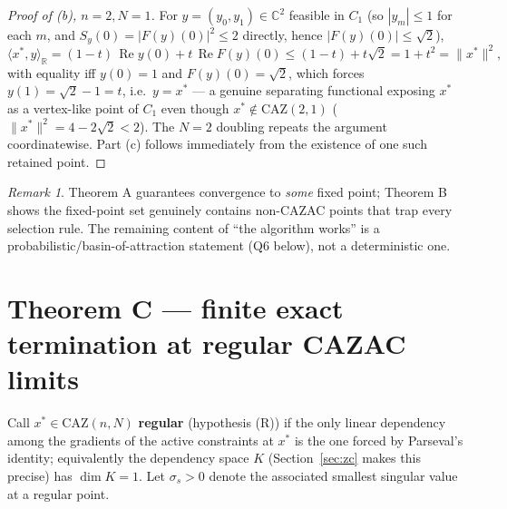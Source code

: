 \documentclass[11pt]{article}
\theoremstyle{plain}
\theoremstyle{definition}
\theoremstyle{remark}
\newtheorem{remark}[theorem]{Remark}
\newcommand{\R}{\mathbb R}
\newcommand{\C}{\mathbb C}
\newcommand{\CAZ}{\mathrm{CAZ}}
\newcommand{\re}{\operatorname{Re}}
\begin{document}
\begin{proof}[Proof of (b), $n=2,N=1$]
For $y=(y_0,y_1)\in\C^2$ feasible in $C_1$ (so $|y_m|\le1$ for each $m$,
and $S_y(0)=|F(y)(0)|^2\le2$ directly, hence $|F(y)(0)|\le\sqrt2$),
$$\langle x^*,y\rangle_\R=(1-t)\,\re y(0)+t\,\re F(y)(0)\le(1-t)+t\sqrt2=1+t^2=\|x^*\|^2,$$
with equality iff $y(0)=1$ and $F(y)(0)=\sqrt2$, which forces
$y(1)=\sqrt2-1=t$, i.e.\ $y=x^*$ --- a genuine separating functional
exposing $x^*$ as a vertex-like point of $C_1$ even though
$x^*\notin\CAZ(2,1)$ ($\|x^*\|^2=4-2\sqrt2<2$). The $N=2$ doubling repeats
the argument coordinatewise. Part (c) follows immediately from the
existence of one such retained point.
\end{proof}

\begin{remark}
Theorem A guarantees convergence to \emph{some} fixed point; Theorem B
shows the fixed-point set genuinely contains non-CAZAC points that trap
every selection rule. The remaining content of ``the algorithm works'' is a
probabilistic/basin-of-attraction statement (Q6 below), not a deterministic
one.
\end{remark}

\section{Theorem C --- finite exact termination at regular CAZAC limits}

Call $x^*\in\CAZ(n,N)$ \textbf{regular} (hypothesis (R)) if the only
linear dependency among the gradients of the active constraints at $x^*$
is the one forced by Parseval's identity; equivalently the dependency
space $K$ (Section~\ref{sec:zc} makes this precise) has $\dim K=1$. Let
$\sigma_s>0$ denote the associated smallest singular value at a regular
point.
\end{document}
